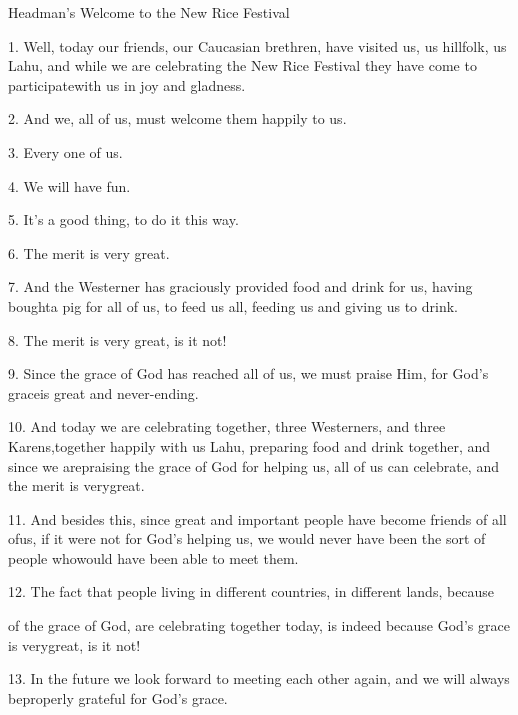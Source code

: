 
\begin{center}
Headman's Welcome to the New Rice Festival
\end{center}

\leftskip=0pt
1. Well, today our friends, our Caucasian brethren, have visited us, us hillfolk,
us Lahu, and while we are celebrating the New Rice Festival they have come to participatewith
us in joy and gladness.

2. And we, all of us, must welcome them happily to us.

3. Every one of us.

4. We will have fun.

5. It's a good thing, to do it this way.

6. The merit is very great.

7. And the Westerner has graciously provided food and drink for us, having boughta
pig for all of us, to feed us all, feeding us and giving us to drink.

8. The merit is very great, is it not!

9. Since the grace of God has reached all of us, we must praise Him, for God's
graceis great and never-ending.

10. And today we are celebrating together, three Westerners, and three Karens,together
happily with us Lahu, preparing food and drink together, and since we arepraising
the grace of God for helping us, all of us can celebrate, and the merit is verygreat.

11. And besides this, since great and important people have become friends of all
ofus, if it were not for God's helping us, we would never have been the sort of
people whowould have been able to meet them.

12. The fact that people living in different countries, in different lands, because

of the grace of God, are celebrating together today, is indeed because God's grace
is verygreat, is it not!

13. In the future we look forward to meeting each other again, and we will always
beproperly grateful for God's grace.


